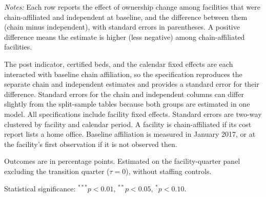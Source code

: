 \documentclass[11pt]{article}
\begin{document}
\begin{table}[!ht]
\begin{threeparttable}
\begin{tablenotes}[flushleft]
\footnotesize
\item \textit{Notes:} Each row reports the effect of ownership change among facilities that were chain-affiliated and independent at baseline, and the difference between them (chain minus independent), with standard errors in parentheses. A positive difference means the estimate is higher (less negative) among chain-affiliated facilities.
\item The post indicator, certified beds, and the calendar fixed effects are each interacted with baseline chain affiliation, so the specification reproduces the separate chain and independent estimates and provides a standard error for their difference. Standard errors for the chain and independent columns can differ slightly from the split-sample tables because both groups are estimated in one model. All specifications include facility fixed effects. Standard errors are two-way clustered by facility and calendar period. A facility is chain-affiliated if its cost report lists a home office. Baseline affiliation is measured in January 2017, or at the facility's first observation if it is not observed then.
\item Outcomes are in percentage points. Estimated on the facility-quarter panel excluding the transition quarter ($\tau = 0$), without staffing controls.
\item Statistical significance: $^{***}p<0.01$, $^{**}p<0.05$, $^{*}p<0.10$.
\end{tablenotes}

\end{threeparttable}
\end{table}
\clearpage
\end{document}
